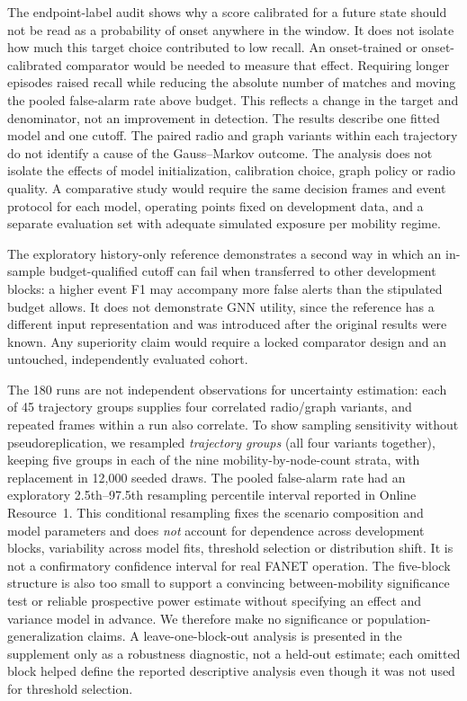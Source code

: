 \documentclass[10pt,a4paper]{article}
\begin{document}
The endpoint-label audit shows why a score calibrated for a future state should not be read as a probability of onset anywhere in the window. It does not isolate how much this target choice contributed to low recall. An onset-trained or onset-calibrated comparator would be needed to measure that effect. Requiring longer episodes raised recall while reducing the absolute number of matches and moving the pooled false-alarm rate above budget. This reflects a change in the target and denominator, not an improvement in detection. The results describe one fitted model and one cutoff. The paired radio and graph variants within each trajectory do not identify a cause of the Gauss--Markov outcome. The analysis does not isolate the effects of model initialization, calibration choice, graph policy or radio quality. A comparative study would require the same decision frames and event protocol for each model, operating points fixed on development data, and a separate evaluation set with adequate simulated exposure per mobility regime.

The exploratory history-only reference demonstrates a second way in which an in-sample budget-qualified cutoff can fail when transferred to other development blocks: a higher event F1 may accompany more false alerts than the stipulated budget allows. It does not demonstrate GNN utility, since the reference has a different input representation and was introduced after the original results were known. Any superiority claim would require a locked comparator design and an untouched, independently evaluated cohort.\par

The 180 runs are not independent observations for uncertainty estimation: each of 45 trajectory groups supplies four correlated radio/graph variants, and repeated frames within a run also correlate. To show sampling sensitivity without pseudoreplication, we resampled \emph{trajectory groups} (all four variants together), keeping five groups in each of the nine mobility-by-node-count strata, with replacement in 12,000 seeded draws. The pooled false-alarm rate had an exploratory 2.5th--97.5th resampling percentile interval reported in Online Resource~1. This conditional resampling fixes the scenario composition and model parameters and does \emph{not} account for dependence across development blocks, variability across model fits, threshold selection or distribution shift. It is not a confirmatory confidence interval for real FANET operation. The five-block structure is also too small to support a convincing between-mobility significance test or reliable prospective power estimate without specifying an effect and variance model in advance. We therefore make no significance or population-generalization claims. A leave-one-block-out analysis is presented in the supplement only as a robustness diagnostic, not a held-out estimate; each omitted block helped define the reported descriptive analysis even though it was not used for threshold selection.
\end{document}
